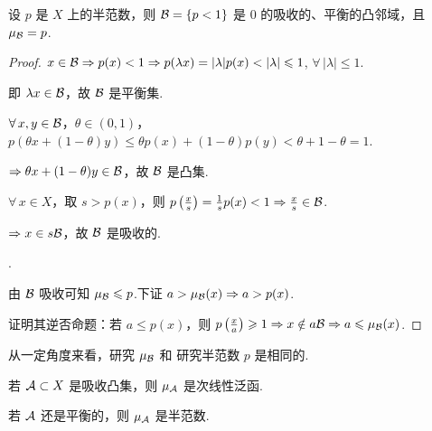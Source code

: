 \begin{proposition}[]
    设 $p$ 是 $X$ 上的半范数，则 $\mathcal{B} = \{p < 1\}$ 是 $0$ 的吸收的、平衡的凸邻域，且 $\mu_{\mathcal{B}} = p$.
\end{proposition}

\begin{proof}
    \par
    $x \in \mathcal{B} \Rightarrow p(x) < 1 \Rightarrow p(\lambda x) = |\lambda| p(x) < |\lambda| \leqslant 1$, $\forall\, |\lambda| \leq 1$.\par
    即 $\lambda x \in \mathcal{B}$，故 $\mathcal{B}$ 是平衡集.\par
    
    \par
    $\forall\, x, y \in \mathcal{B}$，$\theta \in (0, 1)$，$p(\theta x + (1-\theta)y) \leq \theta p(x) + (1-\theta)p(y) < \theta + 1 - \theta = 1$.\par
    $\Rightarrow \theta x + (1-\theta)y \in \mathcal{B}$，故 $\mathcal{B}$ 是凸集.\par

    \par
    $\forall\, x \in X$，取 $s > p(x)$，则 $p\left(\frac{x}{s}\right) = \frac{1}{s} p(x) < 1 \Rightarrow \frac{x}{s} \in \mathcal{B} $.\par
    $\Rightarrow x \in s\mathcal{B}$，故 $\mathcal{B}$ 是吸收的.\par

    .\par
    由 $\mathcal{B}$ 吸收可知 $\mu_{\mathcal{B}} \leqslant p$.下证 $a > \mu_{\mathcal{B}}(x) \Rightarrow a > p(x)$.\par
    证明其逆否命题：若 $a \leq p(x)$，则 $p\left(\frac{x}{a}\right) \geqslant 1 \Rightarrow x \notin a\mathcal{B} \Rightarrow a \leqslant \mu_{\mathcal{B}}(x)$.
\end{proof}

从一定角度来看，研究 $\mu_{\mathcal{B}}$ 和 研究半范数 $p$ 是相同的.

\begin{proposition}[]
    若 $\mathcal{A} \subset X$ 是吸收凸集，则 $\mu_{\mathcal{A}}$ 是次线性泛函.\par
    若 $\mathcal{A}$ 还是平衡的，则 $\mu_{\mathcal{A}}$ 是半范数.
\end{proposition}

